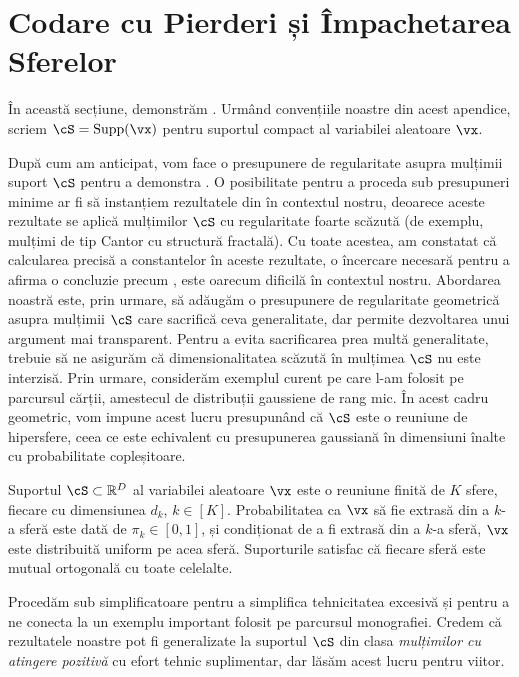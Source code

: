 \documentclass[../../book-main_ro.tex]{subfiles}
\begin{document}
\section{Codare cu Pierderi și Împachetarea Sferelor}\label{app:rate-distortion-covering}

În această secțiune, demonstrăm .
Urmând convențiile noastre din acest apendice, scriem $\cS = \Supp(\vx)$
pentru suportul compact al variabilei aleatoare $\vx$.

După cum am anticipat, vom face o presupunere de regularitate asupra mulțimii suport $\cS$
pentru a demonstra . O posibilitate pentru
a proceda sub presupuneri minime ar fi să instanțiem rezultatele din
\cite{Riegler2018-jh,Riegler2023-rr} în contextul nostru, deoarece aceste rezultate se aplică
mulțimilor $\cS$ cu regularitate foarte scăzută (de exemplu, mulțimi de tip Cantor cu structură
fractală). Cu toate acestea, am constatat că calcularea precisă a constantelor în aceste
rezultate, o încercare necesară pentru a afirma o concluzie precum
, este oarecum dificilă în contextul
nostru.
Abordarea noastră este, prin urmare, să adăugăm o presupunere de regularitate geometrică asupra
mulțimii $\cS$ care sacrifică ceva generalitate, dar permite dezvoltarea
unui argument mai transparent. Pentru a evita sacrificarea prea multă generalitate, trebuie
să ne asigurăm că dimensionalitatea scăzută în mulțimea $\cS$ nu este interzisă.
Prin urmare, considerăm exemplul curent pe care l-am folosit pe parcursul cărții,
amestecul de distribuții gaussiene de rang mic. În acest cadru geometric, vom
impune acest lucru presupunând că $\cS$ este o reuniune de hipersfere, ceea ce este
echivalent cu presupunerea gaussiană în dimensiuni înalte cu probabilitate
copleșitoare.

\begin{assumption}\label{assumption:union-of-spheres}
    Suportul $\cS \subset \R^D$ al variabilei aleatoare $\vx$ este o reuniune
    finită de $K$ sfere, fiecare cu dimensiunea $d_k$, $k \in [K]$.
    Probabilitatea ca $\vx$ să fie extrasă din a $k$-a sferă este dată de
    $\pi_k \in [0, 1]$, și condiționat de a fi extrasă din a $k$-a sferă,
    $\vx$ este distribuită uniform pe acea sferă.
    Suporturile satisfac că fiecare sferă este mutual ortogonală cu toate
    celelalte.
\end{assumption}

Procedăm sub  simplificatoare pentru a
simplifica tehnicitatea excesivă și pentru a ne conecta la un exemplu important
folosit pe parcursul monografiei. Credem că rezultatele noastre pot fi generalizate la
suportul $\cS$ din clasa \textit{mulțimilor cu atingere pozitivă} cu
efort tehnic suplimentar, dar lăsăm acest lucru pentru viitor.
\end{document}
